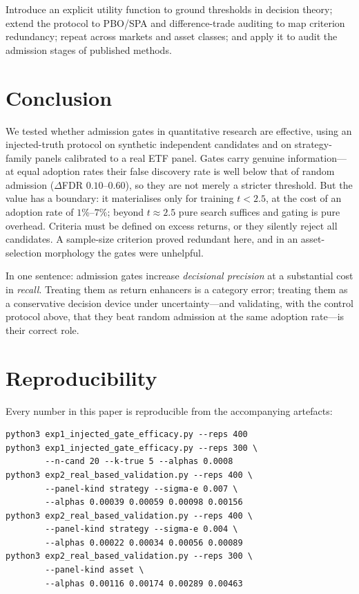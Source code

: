\documentclass[11pt]{article}
\begin{document}
Introduce an explicit utility function to ground thresholds in decision theory; extend the
protocol to PBO/SPA and difference-trade auditing to map criterion redundancy; repeat across
markets and asset classes; and apply it to audit the admission stages of published methods.

\section{Conclusion}
\label{sec:conclusion}

We tested whether admission gates in quantitative research are effective, using an injected-truth
protocol on synthetic independent candidates and on strategy-family panels calibrated to a real ETF
panel. Gates carry genuine information---at equal adoption rates their false discovery rate is well
below that of random admission ($\Delta$FDR $0.10$--$0.60$), so they are not merely a stricter
threshold. But the value has a boundary: it materialises only for training $t<2.5$, at the cost of
an adoption rate of $1\%$--$7\%$; beyond $t\approx2.5$ pure search suffices and gating is pure
overhead. Criteria must be defined on excess returns, or they silently reject all candidates. A
sample-size criterion proved redundant here, and in an asset-selection morphology the gates were
unhelpful.

In one sentence: admission gates increase \emph{decisional precision} at a substantial cost in
\emph{recall}. Treating them as return enhancers is a category error; treating them as a
conservative decision device under uncertainty---and validating, with the control protocol above,
that they beat random admission at the same adoption rate---is their correct role.

\appendix

\section{Reproducibility}
\label{app:repro}

Every number in this paper is reproducible from the accompanying artefacts:

\begin{Verbatim}[fontsize=\small]
python3 exp1_injected_gate_efficacy.py --reps 400
python3 exp1_injected_gate_efficacy.py --reps 300 \
        --n-cand 20 --k-true 5 --alphas 0.0008
python3 exp2_real_based_validation.py --reps 400 \
        --panel-kind strategy --sigma-e 0.007 \
        --alphas 0.00039 0.00059 0.00098 0.00156
python3 exp2_real_based_validation.py --reps 400 \
        --panel-kind strategy --sigma-e 0.004 \
        --alphas 0.00022 0.00034 0.00056 0.00089
python3 exp2_real_based_validation.py --reps 300 \
        --panel-kind asset \
        --alphas 0.00116 0.00174 0.00289 0.00463
\end{Verbatim}
\end{document}
